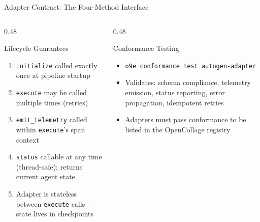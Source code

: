 \begin{frame}[fragile]{Adapter Contract: The Four-Method Interface}
\begin{center}
  \end{center}

  \vspace{0.1cm}

  \begin{columns}[T]
    \begin{column}{0.48\textwidth}
      \begin{exampleblock}{\scriptsize Lifecycle Guarantees}
        \fontsize{5.5}{6.5}\selectfont
        \begin{enumerate}
          \setlength{\itemsep}{0pt}
          \item \texttt{initialize} called exactly once at pipeline startup
          \item \texttt{execute} may be called multiple times (retries)
          \item \texttt{emit\_telemetry} called within \texttt{execute}'s span context
          \item \texttt{status} callable at any time (thread-safe); returns current agent state
          \item Adapter is stateless between \texttt{execute} calls---state lives in checkpoints
        \end{enumerate}
      \end{exampleblock}
    \end{column}
    \begin{column}{0.48\textwidth}
      \begin{alertblock}{\scriptsize Conformance Testing}
        \fontsize{5.5}{6.5}\selectfont
        \begin{itemize}
          \setlength{\itemsep}{0pt}
          \item \texttt{o9e conformance test autogen-adapter}
          \item Validates: schema compliance, telemetry emission, status reporting, error propagation, idempotent retries
          \item Adapters must pass conformance to be listed in the OpenCollage registry
        \end{itemize}
      \end{alertblock}
    \end{column}
  \end{columns}
\end{frame}
